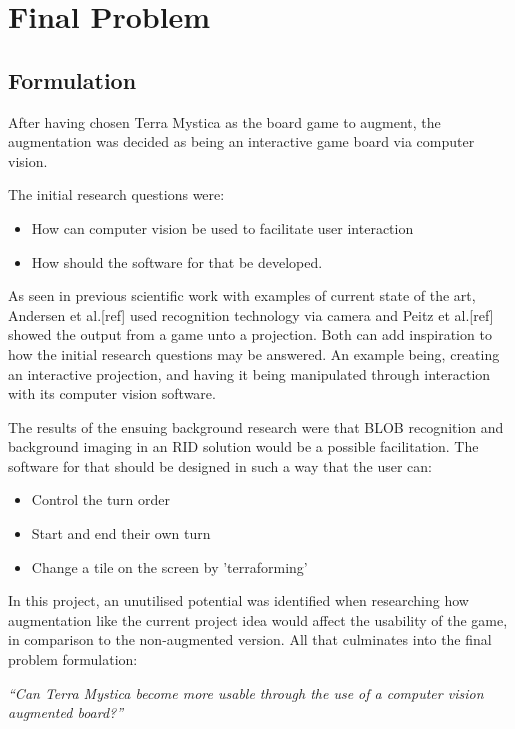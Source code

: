 \chapter{Final Problem}\label{ch:finprob}
\section{Formulation}
After having chosen Terra Mystica as the board game to augment, the augmentation was decided as being an interactive game board via computer vision.

The initial research questions were:
\begin{itemize}
	\item How can computer vision be used to facilitate user interaction 
	\item How should the software for that be developed.
\end{itemize}

As seen in previous scientific work with examples of current state of the art, Andersen et al.[ref] used recognition technology via camera and Peitz et al.[ref] showed the output from a game unto a projection. Both can add inspiration to how the initial research questions may be answered. An example being, creating an interactive projection, and having it being manipulated through interaction with its computer vision software.

The results of the ensuing background research were that BLOB recognition and background imaging in an RID solution would be a possible facilitation.
The software for that should be designed in such a way that the user can:
\begin{itemize}
\item Control the turn order
\item Start and end their own turn
\item Change a tile on the screen by 'terraforming'
\end{itemize}

In this project, an unutilised potential was identified when researching how augmentation like the current project idea would affect the usability of the game, in comparison to the non-augmented version. All that culminates into the final problem formulation:

\textit{“Can Terra Mystica become more usable through the use of a computer vision augmented board?”}

